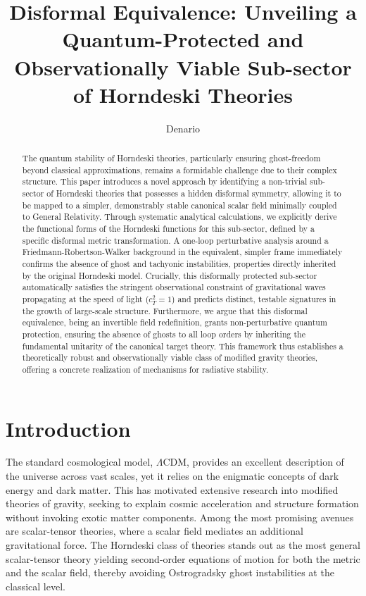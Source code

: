 \documentclass[twocolumn]{aastex631}
\begin{document}
\title{Disformal Equivalence: Unveiling a Quantum-Protected and Observationally Viable Sub-sector of Horndeski Theories}

\author{Denario}

\begin{abstract}
The quantum stability of Horndeski theories, particularly ensuring ghost-freedom beyond classical approximations, remains a formidable challenge due to their complex structure. This paper introduces a novel approach by identifying a non-trivial sub-sector of Horndeski theories that possesses a hidden disformal symmetry, allowing it to be mapped to a simpler, demonstrably stable canonical scalar field minimally coupled to General Relativity. Through systematic analytical calculations, we explicitly derive the functional forms of the Horndeski functions for this sub-sector, defined by a specific disformal metric transformation. A one-loop perturbative analysis around a Friedmann-Robertson-Walker background in the equivalent, simpler frame immediately confirms the absence of ghost and tachyonic instabilities, properties directly inherited by the original Horndeski model. Crucially, this disformally protected sub-sector automatically satisfies the stringent observational constraint of gravitational waves propagating at the speed of light ($c_T^2=1$) and predicts distinct, testable signatures in the growth of large-scale structure. Furthermore, we argue that this disformal equivalence, being an invertible field redefinition, grants non-perturbative quantum protection, ensuring the absence of ghosts to all loop orders by inheriting the fundamental unitarity of the canonical target theory. This framework thus establishes a theoretically robust and observationally viable class of modified gravity theories, offering a concrete realization of mechanisms for radiative stability.
\end{abstract}



\section{Introduction}
\label{sec:intro}

The standard cosmological model, $\Lambda$CDM, provides an excellent description of the universe across vast scales, yet it relies on the enigmatic concepts of dark energy and dark matter. This has motivated extensive research into modified theories of gravity, seeking to explain cosmic acceleration and structure formation without invoking exotic matter components. Among the most promising avenues are scalar-tensor theories, where a scalar field mediates an additional gravitational force. The Horndeski class of theories stands out as the most general scalar-tensor theory yielding second-order equations of motion for both the metric and the scalar field, thereby avoiding Ostrogradsky ghost instabilities at the classical level.
\end{document}
